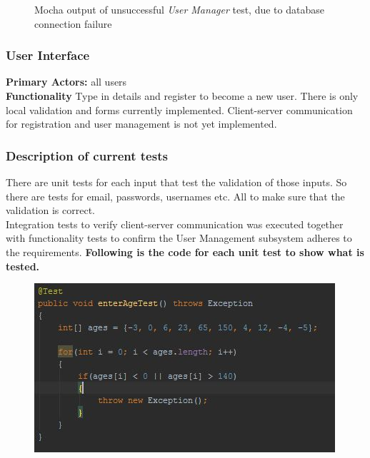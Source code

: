 \documentclass[12pt]{article}
\begin{document}
{\begin{center}
\begin{figure}[h!]
		\caption{Mocha output of unsuccessful \textit{User Manager} test, due to database connection failure}
	\end{figure}
	\end{center}

\pagebreak

	\subsubsection{User Interface}
	\textbf{Primary Actors:} all users \\
	\textbf{Functionality} Type in details and register to become a new user. There is only local validation and forms currently implemented. Client-server communication for registration and user management is not yet implemented.
	\subsubsection{Description of current tests}
	There are unit tests for each input that test the validation of those inputs. So there are tests for email, passwords, usernames etc. All to make sure that the validation is correct. \\
	Integration tests to verify client-server communication was executed together with functionality tests to confirm the User Management subsystem adheres to the requirements. 
	\textbf{Following is the code for each unit test to show what is tested.}
	\begin{center}
	\begin{figure}[h]
		\includegraphics[width=\textwidth]{tests/usrUI/TestAge.JPG}
	\end{figure}


\end{center}}
\end{document}
